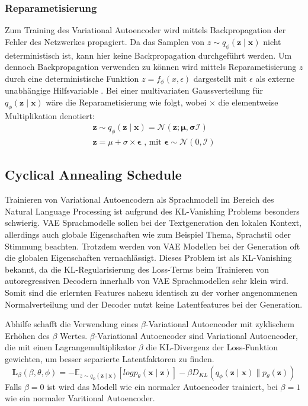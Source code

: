 \subsubsection{Reparametisierung} %
Zum Training des Variational Autoencoder wird mittels Backpropagation der Fehler des Netzwerkes propagiert. Da das Samplen von $z \sim q_\phi(\mathbf{z\mid x})$ nicht deterministisch ist, kann hier keine Backpropagation durchgeführt werden.
Um dennoch Backpropagation verwenden zu können wird mittels Reparametisierung $z$ durch eine deterministische Funktion $z=f_\phi(x,\epsilon)$ dargestellt mit $\epsilon$ als externe unabhängige Hilfsvariable \citep{kingma2014autoencoding,jordan_2018}. 
Bei einer multivariaten Gaussverteilung für $q_\phi (\mathbf{z\mid x})$ wäre die Reparametisierung wie folgt, wobei $\times$ die elementweise Multiplikation denotiert:
\begin{align}
    \mathbf{z} \sim q_\phi(\mathbf{z\mid x}) = \mathcal{N}(\mathbf{z;\mu,\sigma \mathcal{I}}) \\
    \mathbf{z} = \mu + \sigma \times \mathbf{\epsilon} \text{ , mit } \mathbf{\epsilon} \sim \mathcal{N}(0,\mathcal{I}) 
\end{align}

\subsection{Cyclical Annealing Schedule}
\label{cyc_anneal}
Trainieren von Variational Autoencodern als Sprachmodell im Bereich des Natural Language Processing ist aufgrund des KL-Vanishing Problems besonders schwierig.
VAE Sprachmodelle sollen bei der Textgeneration den lokalen Kontext, allerdings auch globale Eigenschaften wie zum Beispiel Thema, Sprachstil oder Stimmung beachten. 
Trotzdem werden von VAE Modellen bei der Generation oft die globalen Eigenschaften vernachlässigt. 
Dieses Problem ist als KL-Vanishing bekannt, da die KL-Regularisierung des Loss-Terms beim Trainieren von autoregressiven Decodern innerhalb von VAE Sprachmodellen sehr klein wird.
Somit sind die erlernten Features nahezu identisch zu der vorher angenommenen Normalverteilung und der Decoder nutzt keine Latentfeatures bei der Generation. %

Abhilfe schafft die Verwendung eines $\beta$-Variational Autoencoder \citep{cyc_anneal} mit zyklischem Erhöhen des $\beta$ Wertes.
$\beta$-Variational Autoencoder sind Variational Autoencoder, die mit einen Lagrangemultiplikator $\beta$ die KL-Divergenz der Loss-Funktion gewichten, um besser separierte Latentfaktoren zu finden.
\begin{equation}
    \mathbf{L}_{\beta} (\beta,\theta,\phi)= -\mathbb{E}_{z\sim q_\phi(\mathbf{z\mid x})}[log p_\theta (\mathbf{x\mid z})]- \beta D_{KL}(q_\phi(\mathbf{z\mid x}) \parallel p_\theta(\mathbf{z})) 
\end{equation}
Falls $\beta = 0$ ist wird das Modell wie ein normaler Autoencoder trainiert, bei $\beta = 1$ wie ein normaler Varitional Autoencoder.

